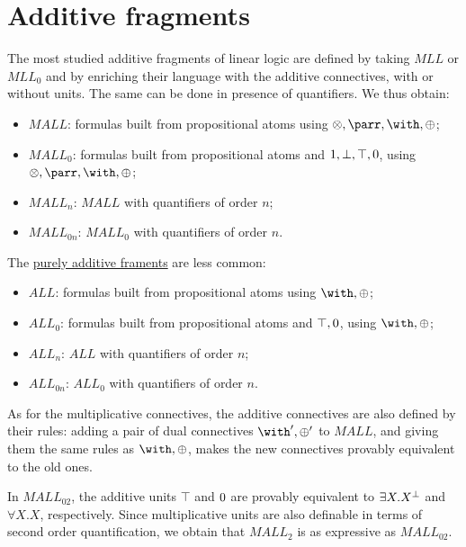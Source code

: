 \section{Additive fragments}\label{additive-fragments}

The most studied additive fragments of linear logic are defined by
taking \(MLL\) or \(MLL_0\) and by enriching their language with the
additive connectives, with or without units. The same can be done in
presence of quantifiers. We thus obtain:

\begin{itemize}
\tightlist
\item
  \(MALL\): formulas built from propositional atoms using
  \(\tens,\parr,\with,\plus\);
\item
  \(MALL_0\): formulas built from propositional atoms and
  \(1,\bot,\top,0\), using \(\tens,\parr,\with,\plus\);
\item
  \(MALL_n\): \(MALL\) with quantifiers of order \(n\);
\item
  \(MALL_{0n}\): \(MALL_0\) with quantifiers of order \(n\).
\end{itemize}

The \href{Additive_linear_logic}{purely additive framents} are less
common:

\begin{itemize}
\tightlist
\item
  \(ALL\): formulas built from propositional atoms using
  \(\with,\plus\);
\item
  \(ALL_0\): formulas built from propositional atoms and \(\top,0\),
  using \(\with,\plus\);
\item
  \(ALL_n\): \(ALL\) with quantifiers of order \(n\);
\item
  \(ALL_{0n}\): \(ALL_0\) with quantifiers of order \(n\).
\end{itemize}

As for the multiplicative connectives, the additive connectives are also
defined by their rules: adding a pair of dual connectives
\(\with',\plus'\) to \(MALL\), and giving them the same rules as
\(\with,\plus\), makes the new connectives provably equivalent to the
old ones.

In \(MALL_{02}\), the additive units \(\top\) and \(0\) are provably
equivalent to \(\exists X.X^\bot\) and \(\forall X.X\), respectively.
Since multiplicative units are also definable in terms of second order
quantification, we obtain that \(MALL_2\) is as expressive as
\(MALL_{02}\).

